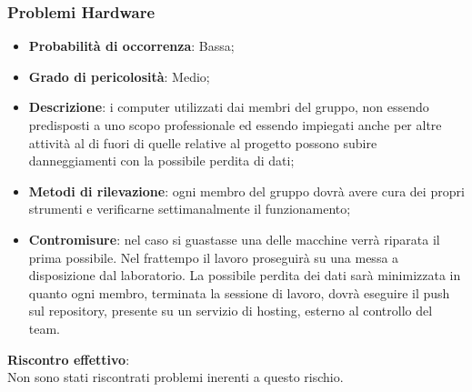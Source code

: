 		\subsubsection{Problemi Hardware} %
		\label{ssub:problemi_hardware}
			\begin{itemize}
				\item \textbf{Probabilità di occorrenza}: Bassa;
				\item \textbf{Grado di pericolosità}: Medio;
				\item \textbf{Descrizione}: i computer utilizzati dai membri del gruppo, non essendo predisposti a uno scopo professionale ed essendo impiegati anche per altre attività al di fuori di quelle relative al progetto possono subire danneggiamenti con la possibile perdita di dati;
				\item \textbf{Metodi di rilevazione}: ogni membro del gruppo dovrà avere cura dei propri strumenti e verificarne settimanalmente il funzionamento;
				\item \textbf{Contromisure}: nel caso si guastasse una delle macchine verrà riparata il prima possibile. Nel frattempo il lavoro proseguirà su una messa a disposizione dal laboratorio. La possibile perdita dei dati sarà minimizzata in quanto ogni membro, terminata la sessione di lavoro, dovrà eseguire il push sul repository, presente su un servizio di hosting, esterno al controllo del team.
			\end{itemize}
		\noindent
		\textbf{Riscontro effettivo}: \\
		Non sono stati riscontrati problemi inerenti a questo rischio.
		
